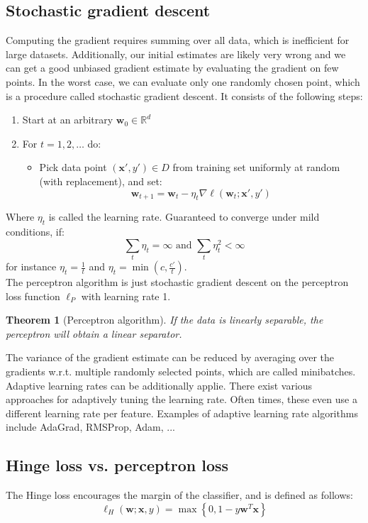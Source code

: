 \documentclass[a4paper,10pt,twoside]{article}
\newtheorem{theorem}{Theorem}
\begin{document}
\subsection{Stochastic gradient descent}
Computing the gradient requires summing over all data, which is inefficient for large datasets. Additionally, our initial estimates are likely very wrong and we can get a good unbiased gradient estimate by evaluating the gradient on few points. In the worst case, we can evaluate only one randomly chosen point, which is a procedure called stochastic gradient descent. It consists of the following steps:
\begin{enumerate}
    \item Start at an arbitrary $\mathbf{w}_0\in\mathbb{R}^d$
    \item For $t=1,2,\ldots$ do:
    \begin{itemize}
        \item Pick data point $(\mathbf{x}',y')\in D$ from training set uniformly at random (with replacement), and set:
        \begin{equation*}
            \mathbf{w}_{t+1}=\mathbf{w}_t-\eta_t\nabla\ell(\mathbf{w}_t;\mathbf{x}',y')
        \end{equation*}
    \end{itemize}
\end{enumerate}
Where $\eta_t$ is called the learning rate. Guaranteed to converge under mild conditions, if:
\begin{equation*}
    \sum_{t}\eta_t=\infty \text{ and }\sum_{t}\eta_t^2<\infty
\end{equation*}
for instance $\eta_t=\frac{1}{t}$ and $\eta_t=\min (c, \frac{c'}{t})$.\\
The perceptron algorithm is just stochastic gradient descent on the perceptron loss function $\ell_P$ with learning rate 1.
\begin{theorem}[Perceptron algorithm]
    If the data is linearly separable, the perceptron will obtain a linear separator.
\end{theorem}
The variance of the gradient estimate can be reduced by averaging over the gradients w.r.t. multiple randomly selected points, which are called minibatches. Adaptive learning rates can be additionally applie. There exist various approaches for adaptively tuning the learning rate. Often times, these even use a different learning rate per feature. Examples of adaptive learning rate algorithms include AdaGrad, RMSProp, Adam, ...
\subsection{Hinge loss vs. perceptron loss}
The Hinge loss encourages the margin of the classifier, and is defined as follows:
\begin{equation*}
    \ell_H(\mathbf{w}; \mathbf{x}, y)=\max\left\{0,1-y\mathbf{w}^T\mathbf{x}\right\}
\end{equation*}
\end{document}
